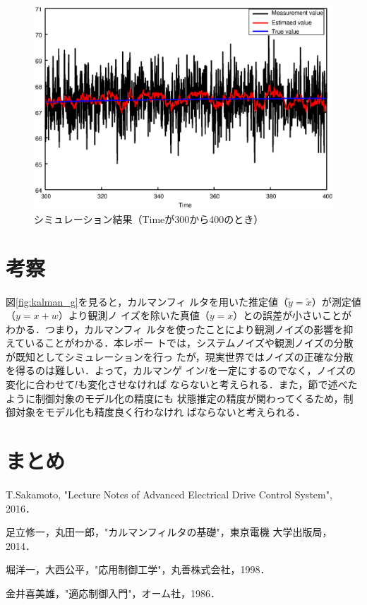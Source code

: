\documentclass[a4paper,12pt]{jarticle}
\begin{document}
%
%
\begin{figure}[htbp]
 \begin{center}
  \includegraphics[width = 150mm]{fig/kalmanfilterB.eps}
 \end{center}
 \caption{シミュレーション結果（Timeが300から400のとき）}
 \label{fig:kalman_B}
\end{figure}
%
\newpage
\section{考察}
図\ref{fig:kalman_g}を見ると，カルマンフィ
ルタを用いた推定値（$\tilde{y}=\tilde{x}$）が測定値（$y=x+w$）より観測ノ
イズを除いた真値（$y=x$）との誤差が小さいことがわかる．つまり，カルマンフィ
ルタを使ったことにより観測ノイズの影響を抑えていることがわかる．本レポー
トでは，システムノイズや観測ノイズの分散が既知としてシミュレーションを行っ
たが，現実世界ではノイズの正確な分散を得るのは難しい．よって，カルマンゲ
イン$l$を一定にするのでなく，ノイズの変化に合わせて$l$も変化させなければ
ならないと考えられる．また，節で述べたように制御対象のモデル化の精度にも
状態推定の精度が関わってくるため，制御対象をモデル化も精度良く行わなけれ
ばならないと考えられる．
%
\section{まとめ}


\newpage
%
\begin{thebibliography}{99}

  T.Sakamoto,
		 "Lecture Notes of Advanced Electrical Drive Control System",
		 2016．

  足立修一，丸田一郎，"カルマンフィルタの基礎"，東京電機
		 大学出版局，2014．

  堀洋一，大西公平，"応用制御工学"，丸善株式会社，1998．

  金井喜美雄，"適応制御入門"，オーム社，1986．
\end{thebibliography}
\end{document}
